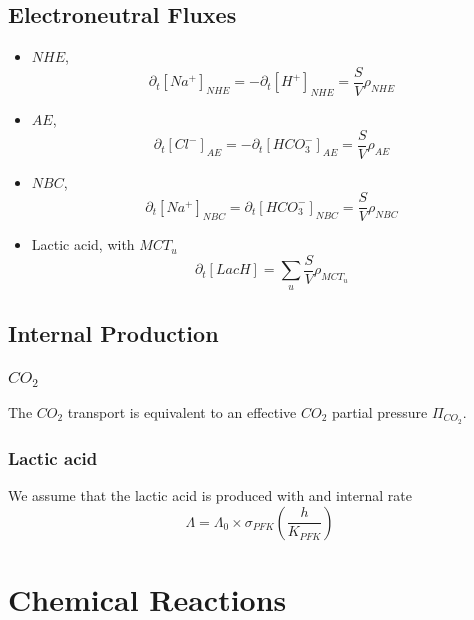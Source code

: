 \documentclass{revtex4}
\begin{document}
\subsection{Electroneutral Fluxes}
\begin{itemize}
	\item $NHE$, 
	\begin{equation}
	\partial_t \left[Na^+\right]_{NHE} = - \partial_t \left[H^+\right]_{NHE} = \dfrac{S}{V} \rho_{NHE}
	\end{equation}
	
	\item $AE$,
	\begin{equation}
	\partial_t \left[Cl^-\right]_{AE} = -\partial_t \left[HCO_3^-\right]_{AE} = \dfrac{S}{V} \rho_{AE}
	\end{equation}
	
	\item $NBC$,
	\begin{equation}
	\partial_t \left[Na^+\right]_{NBC} = \partial_t \left[HCO_3^-\right]_{NBC} = \dfrac{S}{V} \rho_{NBC}
	\end{equation}
		
	\item Lactic acid, with $MCT_u$
	\begin{equation}
	\partial_t \left[LacH\right] = \sum_u \dfrac{S}{V}\rho_{MCT_u}
	\end{equation}
\end{itemize}

\subsection{Internal Production}

\subsubsection{$CO_2$}
The $CO_2$ transport is equivalent to an effective $CO_2$ partial pressure $\Pi_{CO_2}$.

\subsubsection{Lactic acid}
We assume that the lactic acid is produced with and internal rate
\begin{equation}
	\Lambda = \Lambda_0 \times \sigma_{PFK}\left(\dfrac{h}{K_{PFK}}\right)
\end{equation}

\section{Chemical Reactions}
\end{document}
